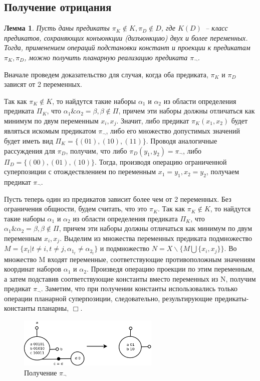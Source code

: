 \documentclass[12pt]{article}
\newtheorem{lemma}[theorem]{Лемма}
\newenvironment{proof}[1][Доказательство]{\begin{trivlist}
\item[\hskip \labelsep {\bfseries #1}]}{\end{trivlist}}
\begin{document}
\subsection{Получение отрицания}
\begin{lemma}
\label{eq:negate}
Пусть даны предикаты $\pi_K \notin K, \pi_D \notin D$, где $K (D)$~-- класс предикатов, 
сохраняющих конъюнкции (дизъюнкцию) двух и более переменных.
Тогда, применением операций подстановки констант и проекции
к предикатам $\pi_K, \pi_D$, можно получить планарную реализацию предиката $\pi_{\neg}$.
\end{lemma}

\begin{proof}
Вначале проведем доказательство для случая, когда оба предиката, $\pi_K$ и $\pi_D$ зависят от 2 переменных.

Так как $\pi_K \notin K$, то найдутся такие наборы $\alpha_1$ и $\alpha_2$ из области определения предиката $\Pi_K$, что
$\alpha_1\&\alpha_2=\beta, \beta \notin \Pi$, причем эти наборы должны отличаться как минимум по двум переменным $x_i, x_{j}$.
Значит, либо предикат $\pi_K(x_1, x_2)$ будет являться искомым предикатом $\pi_{\neg}$, либо его множество
допустимых значений будет иметь вид $\Pi_K = \{ (01), (10), (11) \}$. 
Проводя аналогичные рассуждения для $\pi_D$, получим, что либо $\pi_D(y_1, y_2) = \pi_{\neg}$, либо $\Pi_D = \{ (00), (01), (10) \}$.
Тогда, производя операцию ограниченной суперпозиции с отождествлением по переменным $x_1=y_1, x_2=y_2$, получаем
предикат $\pi_{\neg}$.

Пусть теперь один из предикатов зависит более чем от 2 переменных. Без ограничения общности, будем считать, что это $\pi_K$.
Так как $\pi_K \notin K$, то найдутся такие наборы $\alpha_1$ и $\alpha_2$ из области определения предиката $\Pi_K$, что
$\alpha_1\&\alpha_2=\beta, \beta \notin \Pi$, причем эти наборы должны отличаться как минимум по двум переменным $x_i, x_{j}$.
Выделим из множества переменных предиката подмножество $M = \{ x_t | t \neq i, t \neq j, \alpha_{1_t} \neq \alpha_{2_t} \}$ и 
подмножество $N = X \backslash \{ M \bigcup \{x_i, x_j\} \}$.
Во множество M входят переменные, соответствующие противоположным значениям координат наборов $\alpha_1$ и $\alpha_2$.
Произведя операцию проекции по этим переменным, а затем подставив соответствующие
константы вместо переменных из N, получим предикат $\pi_{\neg}$.
Заметим, что при получении константы использовались только операции планарной суперпозиции, следовательно, 
результирующие предикаты-константы планарны, $\Box$.
\end{proof}
\begin{figure}[htb]
\centering
\includegraphics[width=0.6\textwidth]{negate.png}
\caption{Получение $\pi_{\neg}$}
\label{fig:negation}
\end{figure}
\end{document}
